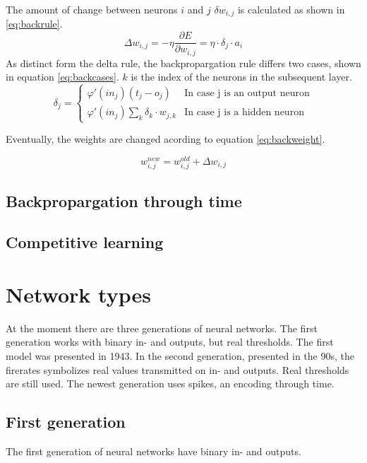 \documentclass[10pt,a4paper,DIV=11]{scrreprt}
\begin{document}
The amount of change between neurons $i$ and $j$ $\delta w_{i,j}$ is calculated as shown in \eqref{eq:backrule}.
\begin{equation}
\Delta w_{i,j} = -\eta \frac{\partial E}{\partial w_{i,j}} = \eta \cdot \delta_j \cdot a_i
\label{eq:backrule}
\end{equation}
As distinct form the delta rule, the backpropargation rule differs two cases, shown in equation \eqref{eq:backcases}. $k$ is the index of the neurons in the subsequent layer.
\begin{equation}
   \delta_j =
   \begin{cases}
     \varphi'(in_j)(t_j-o_j) & \text{In case j is an output neuron} \\
     \varphi'(in_j)\sum_{k} \delta_k \cdot w_{j,k} & \text{In case j is a hidden neuron}
   \end{cases}
\label{eq:backcases}
\end{equation}

Eventually, the weights are changed acording to equation \eqref{eq:backweight}.

\begin{equation}
   w_{i,j}^{new} = w_{i,j}^{old} + \Delta w_{i,j}
\label{eq:backweight}
\end{equation}

\subsection{Backpropargation through time}
\subsection{Competitive learning}
\section{Network types}
At the moment there are three generations of neural networks. 
The first generation works with binary in- and outputs, but real thresholds. The first model was presented in 1943.
In the second generation, presented in the 90s, the firerates symbolizes real values transmitted on in- and outputs. Real thresholds are still used.
The newest generation uses spikes, an encoding through time.

\subsection{First generation}
The first generation of neural networks have binary in- and outputs.
\end{document}
